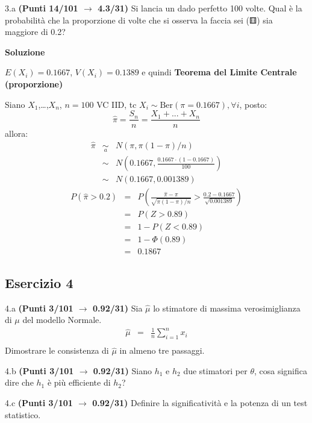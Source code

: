\documentclass[
  11pt,
]{book}
\theoremstyle{mytheoremstyle}
\theoremstyle{mydefstyle}
\begin{document}
3.a \textbf{(Punti 14/101 \(\rightarrow\) 4.3/31)} Si lancia un dado perfetto 100 volte. Qual è la probabilità che la proporzione di volte che si osserva la faccia sei (⚅) sia maggiore di 0.2?

\textbf{Soluzione}

\(E(X_i)=0.1667\), \(V(X_i)=0.1389\) e quindi
\textbf{Teorema del Limite Centrale (proporzione)}

Siano \(X_1\),\ldots,\(X_n\), \(n=100\) VC IID, tc \(X_i\sim\text{Ber}(\pi=0.1667)\)\(,\forall i\), posto:
\[
      \hat\pi=\frac{S_n}n = \frac{X_1 + ... + X_n}n
      \]
allora:\begin{eqnarray*}
  \hat\pi & \mathop{\sim}\limits_{a}& N(\pi,\pi(1-\pi)/n) \\
  &\sim & N\left(0.1667,\frac{0.1667\cdot(1-0.1667)}{100}\right) \\
     &\sim & N(0.1667,0.001389) 
  \end{eqnarray*}\begin{eqnarray*}
      P( \hat\pi   >   0.2 ) 
        &=& P\left(  \frac { \hat\pi  -  \pi }{ \sqrt{\pi(1-\pi)/n} }  >  \frac { 0.2  -  0.1667 }{\sqrt{ 0.001389 }} \right)  \\
                 &=& P\left(  Z   >   0.89 \right) \\    &=& 1-P(Z< 0.89 )\\ 
                 &=&  1-\Phi( 0.89 ) \\ &=&  0.1867 
      \end{eqnarray*}

\subsection{Esercizio 4}\label{esercizio-4-11}

4.a \textbf{(Punti 3/101 \(\rightarrow\) 0.92/31)} Sia \(\hat \mu\) lo stimatore di massima verosimiglianza di \(\mu\) del modello Normale.
\begin{eqnarray*}
  \hat\mu &=&  \frac 1n\sum_{i=1}^nx_i\\
\end{eqnarray*}
Dimostrare le consistenza di \(\hat\mu\) in almeno tre passaggi.

4.b \textbf{(Punti 3/101 \(\rightarrow\) 0.92/31)} Siano \(h_1\) e \(h_2\) due stimatori per \(\theta\), cosa significa dire che \(h_1\) è più efficiente di \(h_2\)?

4.c \textbf{(Punti 3/101 \(\rightarrow\) 0.92/31)} Definire la significatività e la potenza di un test statistico.
\end{document}
